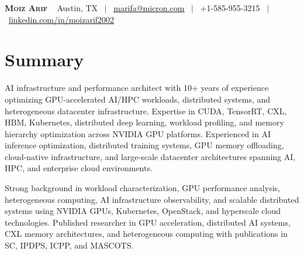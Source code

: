 \documentclass[letterpaper,11pt]{article}
\begin{document}
\begin{center}
    \textbf{\Huge \scshape Moiz Arif} \ \vspace{1pt}
    Austin, TX \ $|$ \ 
    \href{mailto:marifa@micron.com}{\underline{marifa@micron.com}} \ $|$ \ 
    +1-585-955-3215 \ $|$ \ 
    \href{https://linkedin.com/in/moizarif2002}{\underline{linkedin.com/in/moizarif2002}}
\end{center}

\section{Summary}
AI infrastructure and performance architect with 10+ years of experience optimizing GPU-accelerated AI/HPC workloads, distributed systems, and heterogeneous datacenter infrastructure. Expertise in CUDA, TensorRT, CXL, HBM, Kubernetes, distributed deep learning, workload profiling, and memory hierarchy optimization across NVIDIA GPU platforms. Experienced in AI inference optimization, distributed training systems, GPU memory offloading, cloud-native infrastructure, and large-scale datacenter architectures spanning AI, HPC, and enterprise cloud environments.

Strong background in workload characterization, GPU performance analysis, heterogeneous computing, AI infrastructure observability, and scalable distributed systems using NVIDIA GPUs, Kubernetes, OpenStack, and hyperscale cloud technologies. Published researcher in GPU acceleration, distributed AI systems, CXL memory architectures, and heterogeneous computing with publications in SC, IPDPS, ICPP, and MASCOTS.

\end{document}
